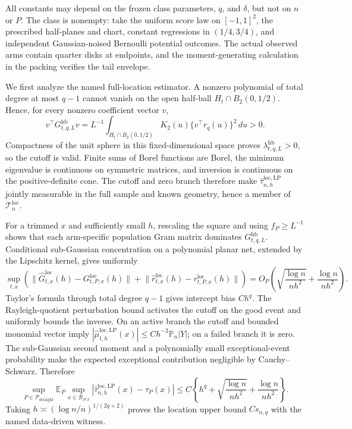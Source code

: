 All constants may depend on the frozen class parameters, \(q\), and \(\delta\), but not on \(n\) or \(P\).  The class is nonempty: take the uniform score law on \([-1,1]^2\), the prescribed half-planes and chart, constant regressions in \((1/4,3/4)\), and independent Gaussian-noised Bernoulli potential outcomes.  The actual observed arms contain quarter disks at endpoints, and the moment-generating calculation in the packing verifies the tail envelope.

We first analyze the named full-location estimator.  A nonzero polynomial of total degree at most \(q-1\) cannot vanish on the open half-ball \(H_t\cap B_2(0,1/2)\).  Hence, for every nonzero coefficient vector \(v\),
\[
 v^\top G^{\mathrm{hb}}_{t,q,L}v
 =L^{-1}\int_{H_t\cap B_2(0,1/2)}K_2(u)
 \{v^\top r_q(u)\}^2\,du>0.
\]
Compactness of the unit sphere in this fixed-dimensional space proves \(\lambda^{\mathrm{hb}}_{t,q,L}>0\), so the cutoff is valid.  Finite sums of Borel functions are Borel, the minimum eigenvalue is continuous on symmetric matrices, and inversion is continuous on the positive-definite cone.  The cutoff and zero branch therefore make \(\widehat\tau^{\mathrm{loc},\mathrm{LP}}_{n,h}\) jointly measurable in the full sample and known geometry, hence a member of \(\mathcal T_n^{\mathrm{loc}}\).

For a trimmed \(x\) and sufficiently small \(h\), rescaling the square and using \(f_P\geq L^{-1}\) shows that each arm-specific population Gram matrix dominates \(G^{\mathrm{hb}}_{t,q,L}\).  Conditional sub-Gaussian concentration on a polynomial planar net, extended by the Lipschitz kernel, gives uniformly
\[
 \sup_{t,x}\left(
 \lVert\widehat G^{\mathrm{loc}}_{t,x}(h)-G^{\mathrm{loc}}_{t,P,x}(h)\rVert
 +\lVert\widehat r^{\mathrm{loc}}_{t,x}(h)-r^{\mathrm{loc}}_{t,P,x}(h)\rVert
 \right)
 =O_P\!\left(\sqrt{\frac{\log n}{nh^2}}+\frac{\log n}{nh^2}\right).
\]
Taylor's formula through total degree \(q-1\) gives intercept bias \(Ch^q\).  The Rayleigh-quotient perturbation bound activates the cutoff on the good event and uniformly bounds the inverse.  On an active branch the cutoff and bounded monomial vector imply \(|\widehat\mu^{\mathrm{loc},\mathrm{LP}}_{t,h}(x)|\leq Ch^{-2}\mathbb P_n|Y|\); on a failed branch it is zero.  The sub-Gaussian second moment and a polynomially small exceptional-event probability make the expected exceptional contribution negligible by Cauchy--Schwarz.  Therefore
\[
 \sup_{P\in\mathcal P_{\mathrm{straight}}}
 \mathbb E_P\sup_{x\in\mathcal B_{P,\delta}}
 |\widehat\tau^{\mathrm{loc},\mathrm{LP}}_{n,h}(x)-\tau_P(x)|
 \leq C\left\{h^q+\sqrt{\frac{\log n}{nh^2}}+\frac{\log n}{nh^2}\right\}.
\]
Taking \(h\asymp(\log n/n)^{1/(2q+2)}\) proves the location upper bound \(Cs_{n,q}\) with the named data-driven witness.

